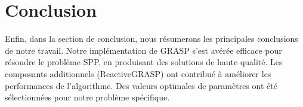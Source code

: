 \documentclass[12pt]{article}
\begin{document}
\section{Conclusion}
Enfin, dans la section de conclusion, nous résumerons les principales conclusions de notre travail. Notre implémentation de GRASP s'est avérée efficace pour résoudre le problème SPP, en produisant des solutions de haute qualité. Les composants additionnels (ReactiveGRASP) ont contribué à améliorer les performances de l'algorithme. Des valeurs optimales de paramètres ont été sélectionnées pour notre problème spécifique.
\end{document}
